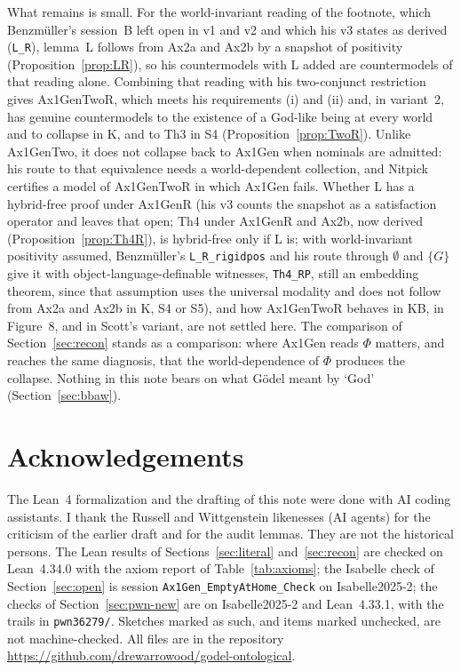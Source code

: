 \documentclass[11pt,a4paper]{article}
\newcommand{\lean}[1]{\texttt{#1}}
\theoremstyle{definition}
\theoremstyle{remark}
\begin{document}
What remains is small.
For the world-invariant reading of the footnote, which Benzm\"uller's session~B
left open in v1 and v2 and which his v3 states as derived (\lean{L\_R}), lemma~L follows from Ax2a and Ax2b by a snapshot of
positivity (Proposition~\ref{prop:LR}), so his countermodels with L added
are countermodels of that reading alone.
Combining that reading with his two-conjunct restriction gives Ax1GenTwoR,
which meets his requirements (i) and (ii) and, in variant~2, has genuine
countermodels to the existence of a God-like being at every world and to
collapse in K, and to Th3 in S4 (Proposition~\ref{prop:TwoR}).
Unlike Ax1GenTwo, it does not collapse back to Ax1Gen when nominals are
admitted: his route to that equivalence needs a world-dependent collection,
and Nitpick certifies a model of Ax1GenTwoR in which Ax1Gen fails.
Whether L has a hybrid-free proof under Ax1GenR (his v3 counts the snapshot
as a satisfaction operator and leaves that open; Th4 under Ax1GenR and Ax2b, now derived
(Proposition~\ref{prop:Th4R}), is hybrid-free only if L is; with world-invariant positivity assumed, Benzm\"uller's \lean{L\_R\_rigidpos} and his route through \(\emptyset\) and \(\{G\}\) give it with object-language-definable witnesses, \lean{Th4\_RP}, still an embedding theorem, since that assumption uses the universal modality and does not follow from Ax2a and Ax2b in K, S4 or S5), and how Ax1GenTwoR behaves in KB, in Figure~8, and in Scott's
variant, are not settled here.
The comparison of Section~\ref{sec:recon} stands as a comparison: where
Ax1Gen reads \(\Phi\) matters, and \cite[Sect.~6.4; v3 Sect.~6.5]{benzmuellerPWN2026}
reaches the same diagnosis, that the world-dependence of \(\Phi\) produces
the collapse.
Nothing in this note bears on what G\"odel meant by `God'
(Section~\ref{sec:bbaw}).

\section*{Acknowledgements}

The Lean~4 formalization and the drafting of this note were done with AI
coding assistants.
I thank the Russell and Wittgenstein likenesses (AI agents) for the criticism
of the earlier draft and for the audit lemmas.
They are not the historical persons.
The Lean results of Sections~\ref{sec:literal} and~\ref{sec:recon} are
checked on Lean~4.34.0 with the axiom report of Table~\ref{tab:axioms}; the
Isabelle check of Section~\ref{sec:open} is session
\lean{Ax1Gen\_EmptyAtHome\_Check} on Isabelle2025-2; the checks of
Section~\ref{sec:pwn-new} are on Isabelle2025-2 and Lean~4.33.1, with the
trails in \lean{pwn36279/}.
Sketches marked as such, and items marked unchecked, are not machine-checked.
All files are in the repository
\url{https://github.com/drewarrowood/godel-ontological}.



\end{document}
